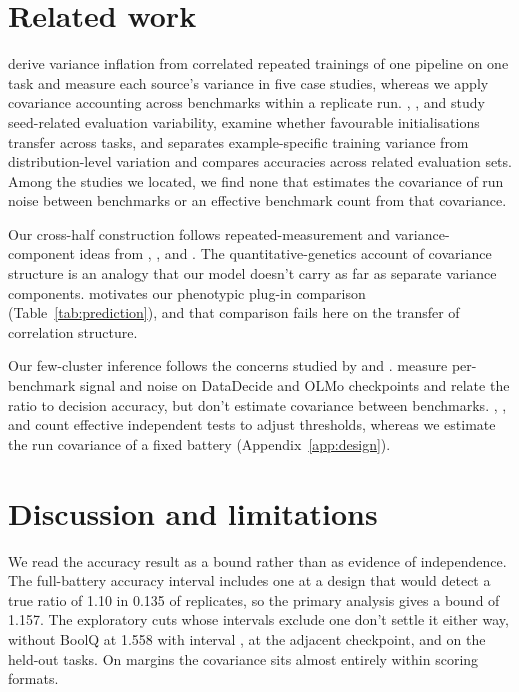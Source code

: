 \section{Related work}
\citet{bouthillier2021} derive variance inflation from correlated repeated trainings of one pipeline on one task and measure each source's variance in five case studies, whereas we apply covariance accounting across benchmarks within a replicate run. \citet{reimers2017}, \citet{zhou2020}, and \citet{madaan2024} study seed-related evaluation variability, \citet{dodge2020} examine whether favourable initialisations transfer across tasks, and \citet{jordan2024} separates example-specific training variance from distribution-level variation and compares accuracies across related evaluation sets. Among the studies we located, we find none that estimates the covariance of run noise between benchmarks or an effective benchmark count from that covariance.

Our cross-half construction follows repeated-measurement and variance-component ideas from \citet{spearman1904}, \citet{cronbach1951}, and \citet{searle1992}. The quantitative-genetics account of covariance structure \citep{martin1977} is an analogy that our model doesn't carry as far as separate variance components. \citet{cheverud1988} motivates our phenotypic plug-in comparison (Table~\ref{tab:prediction}), and that comparison fails here on the transfer of correlation structure.

Our few-cluster inference follows the concerns studied by \citet{cameron2008} and \citet{mackinnon2017}. \citet{heineman2025} measure per-benchmark signal and noise on DataDecide and OLMo checkpoints and relate the ratio to decision accuracy, but don't estimate covariance between benchmarks. \citet{cheverud2001}, \citet{nyholt2004}, and \citet{li2005} count effective independent tests to adjust thresholds, whereas we estimate the run covariance of a fixed battery (Appendix~\ref{app:design}).

\section{Discussion and limitations}
We read the accuracy result as a bound rather than as evidence of independence. The full-battery accuracy interval includes one at a design that would detect a true ratio of 1.10 in 0.135 of replicates, so the primary analysis gives a bound of 1.157. The exploratory cuts whose intervals exclude one don't settle it either way, without BoolQ at 1.558 with interval , at the adjacent checkpoint, and on the held-out tasks. On margins the covariance sits almost entirely within scoring formats.

